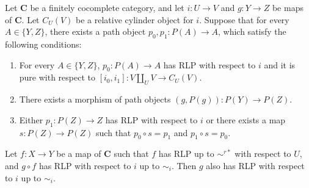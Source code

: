 \documentclass{tac}
\theoremstyle{definition}
\newcommand{\cat}[1]{\mathbf{#1}}
\newcommand{\C}{\cat{C}}
\newcommand{\cyli}{i}
\begin{document}
\begin{lem}[we-bot]
Let $\C$ be a finitely cocomplete category, and let $i : U \to V$ and $g : Y \to Z$ be maps of $\C$.
Let $C_U(V)$ be a relative cylinder object for $i$.
Suppose that for every $A \in \{ Y, Z \}$, there exists a path object $p_0,p_1 : P(A) \to A$, which satisfy the following conditions:
\begin{enumerate}
\item For every $A \in \{ Y, Z \}$, $p_0 : P(A) \to A$ has RLP with respect to $i$ and it is pure with respect to $[\cyli_0,\cyli_1] : V \amalg_U V \to C_U(V)$.
\item There exists a morphism of path objects $(g,P(g)) : P(Y) \to P(Z)$.
\item Either $p_1 : P(Z) \to Z$ has RLP with respect to $i$ or there exists a map $s : P(Z) \to P(Z)$ such that $p_0 \circ s = p_1$ and $p_1 \circ s = p_0$.
\end{enumerate}

Let $f : X \to Y$ be a map of $\C$ such that $f$ has RLP up to $\sim^{r*}$ with respect to $U$, and $g \circ f$ has RLP with respect to $i$ up to $\sim_i$.
Then $g$ also has RLP with respect to $i$ up to $\sim_i$.
\end{lem}
\end{document}
